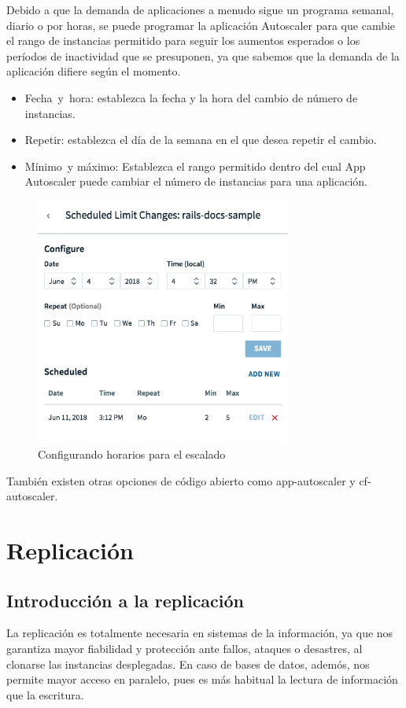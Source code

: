 \documentclass[a4paper,11pt]{article}
\begin{document}
Debido a que la demanda de aplicaciones a menudo sigue un programa semanal, diario o por horas, se puede programar la aplicación Autoscaler para que cambie el rango de instancias permitido para seguir los aumentos esperados o los períodos de inactividad que se presuponen, ya que sabemos que la demanda de la aplicación difiere según el momento.
\begin{itemize}
  \item Fecha y hora: establezca la fecha y la hora del cambio de número de instancias.
  \item Repetir: establezca el día de la semana en el que desea repetir el cambio.
  \item Mínimo y máximo: Establezca el rango permitido dentro del cual App Autoscaler puede cambiar el número de instancias para una aplicación.
\end{itemize}
\begin{figure}[H]
    \centering
    \includegraphics[width=0.75\textwidth]{fran4.png}
    \caption{Configurando horarios para el escalado}
    \label{fig:fran4}
\end{figure}
También existen otras opciones de código abierto como app-autoscaler y cf-autoscaler.


\section{Replicación}

\subsection{Introducción a la replicación}
La replicación es totalmente necesaria en sistemas de la información, ya que nos garantiza mayor fiabilidad y protección ante fallos, ataques o desastres, al clonarse las instancias desplegadas. En caso de bases de datos, ademós, nos permite mayor acceso en paralelo, pues es más habitual la lectura de información que la escritura.
\end{document}
